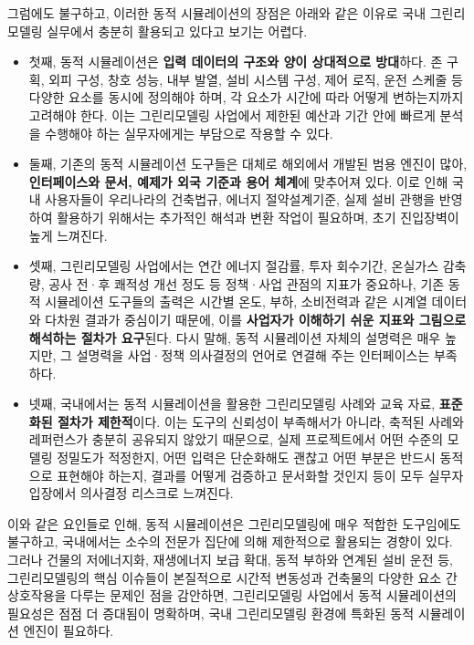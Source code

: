 그럼에도 불구하고, 이러한 동적 시뮬레이션의 장점은 아래와 같은 이유로 국내 그린리모델링 실무에서 충분히 활용되고 있다고 보기는 어렵다.
\begin{itemize}
  \item 첫째, 동적 시뮬레이션은 \textbf{입력 데이터의 구조와 양이 상대적으로 방대}하다. 존 구획, 외피 구성, 창호 성능, 내부 발열, 설비 시스템 구성, 제어 로직, 운전 스케줄 등 다양한 요소를 동시에 정의해야 하며, 각 요소가 시간에 따라 어떻게 변하는지까지 고려해야 한다. 이는 그린리모델링 사업에서 제한된 예산과 기간 안에 빠르게 분석을 수행해야 하는 실무자에게는 부담으로 작용할 수 있다.
  \item 둘째, 기존의 동적 시뮬레이션 도구들은 대체로 해외에서 개발된 범용 엔진이 많아, \textbf{인터페이스와 문서, 예제가 외국 기준과 용어 체계}에 맞추어져 있다. 이로 인해 국내 사용자들이 우리나라의 건축법규, 에너지 절약설계기준, 실제 설비 관행을 반영하여 활용하기 위해서는 추가적인 해석과 변환 작업이 필요하며, 초기 진입장벽이 높게 느껴진다.
  \item 셋째, 그린리모델링 사업에서는 연간 에너지 절감률, 투자 회수기간, 온실가스 감축량, 공사 전·후 쾌적성 개선 정도 등 정책·사업 관점의 지표가 중요하나, 기존 동적 시뮬레이션 도구들의 출력은 시간별 온도, 부하, 소비전력과 같은 시계열 데이터와 다차원 결과가 중심이기 때문에, 이를 \textbf{사업자가 이해하기 쉬운 지표와 그림으로 해석하는 절차가 요구}된다. 다시 말해, 동적 시뮬레이션 자체의 설명력은 매우 높지만, 그 설명력을 사업·정책 의사결정의 언어로 연결해 주는 인터페이스는 부족하다.
  \item 넷째, 국내에서는 동적 시뮬레이션을 활용한 그린리모델링 사례와 교육 자료, \textbf{표준화된 절차가 제한적}이다. 이는 도구의 신뢰성이 부족해서가 아니라, 축적된 사례와 레퍼런스가 충분히 공유되지 않았기 때문으로, 실제 프로젝트에서 어떤 수준의 모델링 정밀도가 적정한지, 어떤 입력은 단순화해도 괜찮고 어떤 부분은 반드시 동적으로 표현해야 하는지, 결과를 어떻게 검증하고 문서화할 것인지 등이 모두 실무자 입장에서 의사결정 리스크로 느껴진다.
\end{itemize}

이와 같은 요인들로 인해, 동적 시뮬레이션은 그린리모델링에 매우 적합한 도구임에도 불구하고, 국내에서는 소수의 전문가 집단에 의해 제한적으로 활용되는 경향이 있다.
그러나 건물의 저에너지화, 재생에너지 보급 확대, 동적 부하와 연계된 설비 운전 등, 그린리모델링의 핵심 이슈들이 본질적으로 시간적 변동성과 건축물의 다양한 요소 간 상호작용을 다루는 문제인 점을 감안하면, 그린리모델링 사업에서 동적 시뮬레이션의 필요성은 점점 더 증대됨이 명확하며, 국내 그린리모델링 환경에 특화된 동적 시뮬레이션 엔진이 필요하다.

